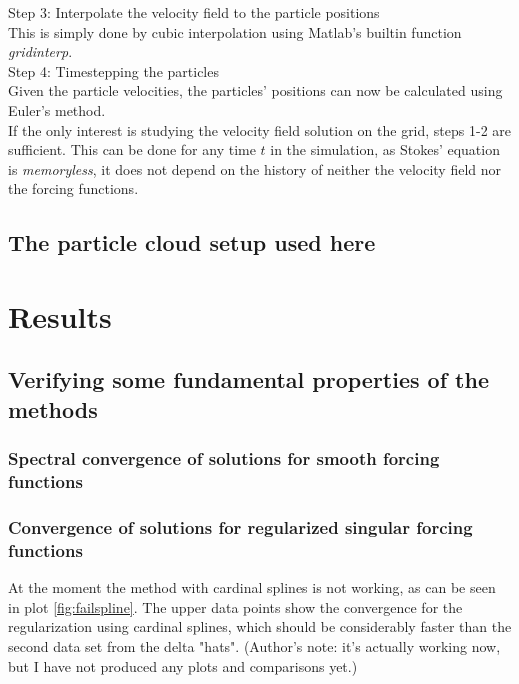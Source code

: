 \documentclass[a4paper,twoside=false,abstract=false,numbers=noenddot,
titlepage=false,headings=small,parskip=half,version=last]{scrartcl}
\begin{document}
Step 3: Interpolate the velocity field to the particle positions\\
This is simply done by cubic interpolation using Matlab's builtin function \emph{gridinterp}.\\
Step 4: Timestepping the particles\\
Given the particle velocities, the particles' positions can now be calculated using Euler's method.\\

If the only interest is studying the velocity field solution on the grid, steps 1-2 are sufficient. This can be done for any time $t$ in the simulation, as Stokes' equation is \emph{memoryless}, it does not depend on the history of neither the velocity field nor the forcing functions.

\subsection{The particle cloud setup used here}

\section{Results}

\subsection{Verifying some fundamental properties of the methods}
\subsubsection{Spectral convergence of solutions for smooth forcing functions}
\subsubsection{Convergence of solutions for regularized singular forcing functions}

At the moment the method with cardinal splines is not working, as can be seen in plot \ref{fig:failspline}. The upper data points show the convergence for the regularization using cardinal splines, which should be considerably faster than the second data set from the delta "hats". (Author's note: it's actually working now, but I have not produced any plots and comparisons yet.)
\end{document}
